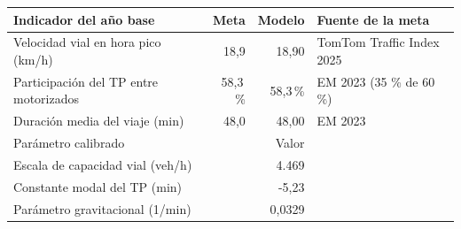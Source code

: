 \begin{tabular}{lrrl}
\toprule
Indicador del año base & Meta & Modelo & Fuente de la meta \\
\midrule
Velocidad vial en hora pico (km/h) & 18,9 & 18,90 & TomTom Traffic Index 2025 \\
Participación del TP entre motorizados & 58,3\,\% & 58,3\,\% & EM 2023 (35 \% de 60 \%) \\
Duración media del viaje (min) & 48,0 & 48,00 & EM 2023 \\
\midrule
Parámetro calibrado & \multicolumn{2}{r}{Valor} & \\
\midrule
Escala de capacidad vial (veh/h) & \multicolumn{2}{r}{4.469} & \\
Constante modal del TP (min) & \multicolumn{2}{r}{-5,23} & \\
Parámetro gravitacional (1/min) & \multicolumn{2}{r}{0,0329} & \\
\bottomrule
\end{tabular}
